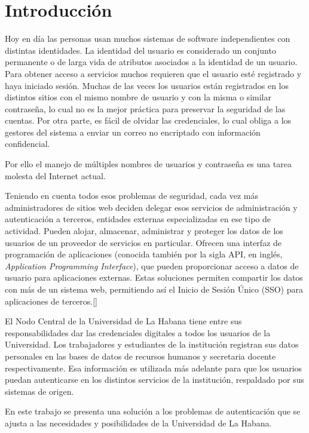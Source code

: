 \chapter*{Introducción}\label{chapter:introduction}

Hoy en día las personas usan muchos sistemas de software independientes con distintas identidades. La identidad del usuario es considerado un conjunto permanente o de larga vida de atributos asociados a la identidad de un usuario. Para obtener acceso a servicios muchos requieren que el usuario esté registrado y haya iniciado sesión. Muchas de las veces los usuarios están registrados en los distintos sitios con el mismo nombre de usuario y con la misma o similar contraseña, lo cual no es la mejor práctica para preservar la seguridad de las cuentas. Por otra parte, es fácil de olvidar las credenciales, lo cual obliga a los gestores del sistema a enviar un correo no encriptado con información confidencial.

Por ello el manejo de múltiples nombres de usuarios y contraseña es una tarea molesta del Internet actual.

Teniendo en cuenta todos esos problemas de seguridad, cada vez más administradores de sitios web deciden delegar esos servicios de administración y autenticación a terceros, entidades externas especializadas en ese tipo de actividad. Pueden alojar, almacenar, administrar y proteger los datos de los usuarios de un proveedor de servicios en particular. Ofrecen una interfaz de programación de aplicaciones (conocida también por la sigla API, en inglés, \textit{Application Programming Interface}), que pueden proporcionar acceso a datos de usuario para aplicaciones externas. Estas soluciones permiten compartir los datos con más de un sistema web, permitiendo así el Inicio de Sesión Único (SSO) para aplicaciones de terceros.[\cite{kutera2016single}]

El Nodo Central de la Universidad de La Habana tiene entre sus responsabilidades dar las credenciales digitales a todos los usuarios de la Universidad. Los trabajadores y estudiantes de la institución registran sus datos personales en las bases de datos de recursos humanos y secretaria docente respectivamente. Esa información es utilizada más adelante para que los usuarios puedan autenticarse en los distintos servicios de la institución, respaldado por sus sistemas de origen.

En este trabajo se presenta una solución a los problemas de autenticación que se ajusta a las necesidades y posibilidades de la Universidad de La Habana.  

